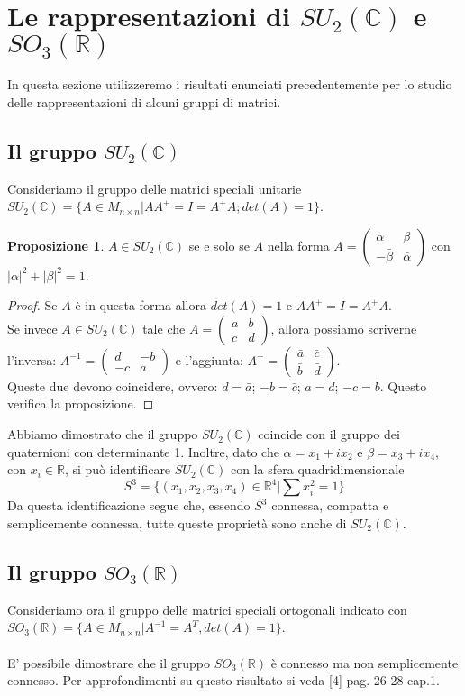 \documentclass[12pt,a4paper]{report}
\theoremstyle{definition}
\newtheorem{Prop}[Def]{Proposizione}
\theoremstyle{definition}
\theoremstyle{definition}
\theoremstyle{definition}
\begin{document}
\section{Le rappresentazioni di $SU_2(\mathbb{C})$ e $SO_3(\mathbb{R})$} 
In questa sezione utilizzeremo i risultati enunciati precedentemente per lo studio delle rappresentazioni di alcuni gruppi di matrici.
\subsection{Il gruppo $SU_2(\mathbb{C})$ }
Consideriamo il gruppo delle matrici speciali unitarie $SU_2(\mathbb{C})=\{A\in M_{n\times n}|AA^{+}=I=A^{+}A;det(A)=1\}$.
\begin{Prop}
	$A\in SU_2(\mathbb{C})$ se e solo se $A$ nella forma $A=
	\begin{pmatrix}
		\alpha & \beta \\
		-\bar{\beta} & \bar{\alpha}
	\end{pmatrix}
	$ con $|\alpha|^2+|\beta|^2=1$.
\end{Prop}
\begin{proof}
	Se $A$ è in questa forma allora $det(A)=1$ e $AA^{+}=I=A^{+}A$.\\
	Se invece $A\in SU_2(\mathbb{C})$ tale che $A=
	\begin{pmatrix}
		a & b \\
		c & d
	\end{pmatrix}$, allora possiamo scriverne l'inversa:
$A^{-1}=\begin{pmatrix}
	d & -b \\
	-c & a
\end{pmatrix}$ e l'aggiunta: $A^+=
\begin{pmatrix}
	\bar{a} & \bar{c} \\
	\bar{b} & \bar{d}
\end{pmatrix}$.\\
Queste due devono coincidere, ovvero: $d=\bar{a}$; $-b=\bar{c}$; $a=\bar{d}$; $-c=\bar{b}$. Questo verifica la proposizione.
\end{proof}
Abbiamo dimostrato che il gruppo $SU_2(\mathbb{C})$ coincide con il gruppo dei quaternioni con determinante 1.
Inoltre, dato che $\alpha=x_1+ix_2$ e $\beta=x_3+ix_4$, con $x_i\in\mathbb{R}$, si può identificare $SU_2(\mathbb{C})$ con la sfera quadridimensionale $$S^3=\{(x_1,x_2,x_3,x_4)\in \mathbb{R}^4|\sum x_i^2=1\}$$
Da questa identificazione segue che, essendo $S^3$ connessa, compatta e semplicemente connessa, tutte queste proprietà sono anche di $SU_2(\mathbb{C})$.
\subsection{Il gruppo $SO_3(\mathbb{R})$}
Consideriamo ora il gruppo delle matrici speciali ortogonali indicato con $SO_3(\mathbb{R})=\{A\in M_{n\times n}|A^{-1}=A^T, det(A)=1\}$.\\
\\
E' possibile dimostrare che il gruppo $SO_3(\mathbb{R})$ è connesso ma non semplicemente connesso. Per approfondimenti su questo risultato si veda [4] pag. 26-28 cap.1.
\end{document}
